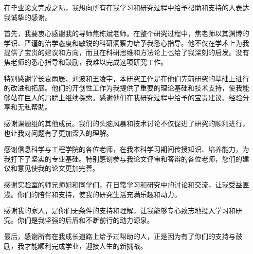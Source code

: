 \documentclass[AutoFakeBold]{LZUThesis}
\begin{document}
\backmatter
\printbib

\Thanks

在毕业论文完成之际，我想向所有在我学习和研究过程中给予帮助和支持的人表达我诚挚的感谢。

首先，我要衷心感谢我的导师焦栋斌老师。在整个研究过程中，焦老师以其渊博的学识、严谨的治学态度和敏锐的科研洞察力给予我悉心指导。他不仅在学术上为我提供了宝贵的建议和方向，而且在科研思维和方法论上也给了我深刻的启发。没有焦老师的悉心指导和鼓励，我难以完成这项研究工作。

特别感谢学长袁雨辰、刘波和王凌宇，本研究工作是在他们先前研究的基础上进行的改进和拓展。他们的开创性工作为我提供了重要的理论基础和技术支持，使我能够站在巨人的肩膀上继续探索。感谢他们在我研究过程中给予的宝贵建议、经验分享和无私帮助。

感谢课题组的其他成员。我们的头脑风暴和技术讨论不仅促进了研究的顺利进行，也让我对问题有了更加深入的理解。

感谢信息科学与工程学院的各位老师，在我本科学习期间传授知识、培养能力，为我打下了坚实的专业基础。特别感谢参与我论文评审和答辩的各位老师，您们的建议和意见使我的论文更加完善。

感谢实验室的师兄师姐和同学们，在日常学习和研究中的讨论和交流，让我受益匪浅。你们的陪伴和支持，使我的研究生活充满乐趣和动力。

感谢我的家人，是你们无条件的支持和理解，让我能够专心致志地投入学习和研究。你们是我坚强的后盾和不断前行的动力源泉。

最后，感谢所有在我成长道路上给予过帮助的人，正是因为有了你们的支持与鼓励，我才能顺利完成学业，迎接人生的新挑战。

\Grade
\end{document}
